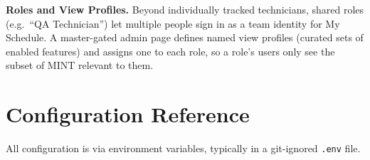 \documentclass[11pt,a4paper]{article}
\newcommand{\code}[1]{\texttt{#1}}
\begin{document}
\textbf{Roles and View Profiles.} Beyond individually tracked technicians,
shared roles (e.g.\ ``QA Technician'') let multiple people sign in as a team
identity for My Schedule. A master-gated admin page defines named view
profiles (curated sets of enabled features) and assigns one to each role,
so a role's users only see the subset of MINT relevant to them.

\section{Configuration Reference}
\label{sec:config}

All configuration is via environment variables, typically in a git-ignored
\code{.env} file.
\end{document}

